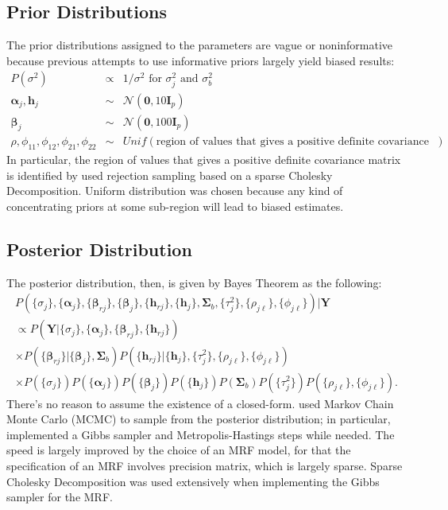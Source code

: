 \documentclass{article}
\begin{document}
\subsection{Prior Distributions}
\label{sec: priors}
The prior distributions assigned to the parameters are vague or noninformative because previous attempts to use informative priors largely yield biased results: 
\begin{eqnarray*}
    P(\sigma^2) &\propto& 1/\sigma^2 \text{ for } \sigma_{j}^2 \text{ and } \sigma_{b}^2\\
    \boldsymbol{\alpha}_j, \boldsymbol{h}_j &\sim& \mathcal{N}(\boldsymbol{0}, 10 \boldsymbol{I}_p) \\
    \boldsymbol{\beta}_j &\sim& \mathcal{N}(\boldsymbol{0}, 100 \boldsymbol{I}_p) \\
    \rho, \phi_{11}, \phi_{12}, \phi_{21}, \phi_{22} &\sim& Unif(\text{region of values that gives a positive definite covariance matrix})
\end{eqnarray*}
In particular, the region of values that gives a positive definite covariance matrix is identified by \cite{paper} used rejection sampling based on a sparse Cholesky Decomposition. Uniform distribution was chosen because any kind of concentrating priors at some sub-region will lead to biased estimates. 

\subsection{Posterior Distribution}
The posterior distribution, then, is given by Bayes Theorem as the following:
\begin{eqnarray*}
    P(\{\sigma_j \}, \{\boldsymbol{\alpha}_j \}, \{\boldsymbol{\beta}_{rj} \}, \{\boldsymbol{\beta}_{j} \} ,  \{\boldsymbol{h}_{rj}\}, \{\boldsymbol{h}_{j}\}, \boldsymbol{\Sigma}_b, \{\tau_j^2\}, \{\rho_{j\ell}\}, \{\phi_{j\ell}\}) | \boldsymbol{Y} \\
    \propto P(\boldsymbol{Y} | \{\sigma_j \}, \{\boldsymbol{\alpha}_j \}, \{\boldsymbol{\beta}_{rj} \}, \{\boldsymbol{h}_{rj}\}) \\
    \times P(\{\boldsymbol{\beta}_{rj}\} |  \{\boldsymbol{\beta}_j \}, \boldsymbol{\Sigma}_b) P(\{\boldsymbol{h}_{rj}\} | \{\boldsymbol{h}_j \}, \{\tau^2_j \}, \{\rho_{j\ell} \}, \{\phi_{j\ell}\}) \\
    \times P(\{\sigma_j \})P(\{\boldsymbol{\alpha}_j \})P(\{\boldsymbol{\beta}_j \}) P(\{\boldsymbol{h}_j\}) P(\boldsymbol{\Sigma}_b) P(\{\tau_j^2\}) P(\{\rho_{j\ell}\}, \{\phi_{j\ell}\}).
\end{eqnarray*}
There's no reason to assume the existence of a closed-form. \cite{paper} used Markov Chain Monte Carlo (MCMC) to sample from the posterior distribution; in particular, \cite{paper} implemented a Gibbs sampler and Metropolis-Hastings steps while needed. The speed is largely improved by the choice of an MRF model, for that the specification of an MRF involves precision matrix, which is largely sparse. Sparse Cholesky Decomposition was used extensively when implementing the Gibbs sampler for the MRF.
\end{document}
